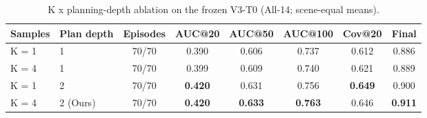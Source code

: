 \begin{table}[t]
\centering
\small
\begin{tabular}{llcccccc}
\toprule
Samples & Plan depth & Episodes & AUC@20 & AUC@50 & AUC@100 & Cov@20 & Final \\
\midrule
K = 1 & 1 & 70/70 & 0.390 & 0.606 & 0.737 & 0.612 & 0.886 \\
K = 4 & 1 & 70/70 & 0.399 & 0.609 & 0.740 & 0.621 & 0.889 \\
\midrule
K = 1 & 2 & 70/70 & \textbf{0.420} & 0.631 & 0.756 & \textbf{0.649} & 0.900 \\
K = 4 & 2 (Ours) & 70/70 & \textbf{0.420} & \textbf{0.633} & \textbf{0.763} & 0.646 & \textbf{0.911} \\
\bottomrule
\end{tabular}
\caption{K x planning-depth ablation on the frozen V3-T0 (All-14; scene-equal means).}
\label{tab:kdepth}
\end{table}
